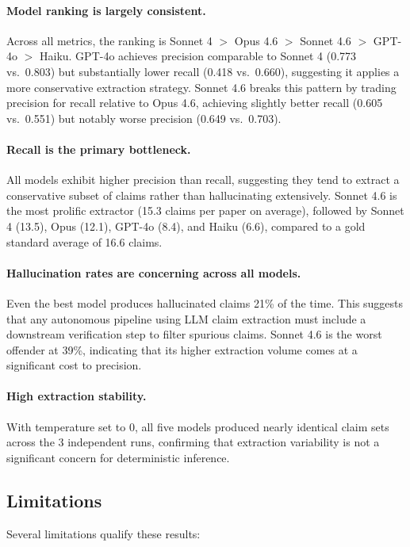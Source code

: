 \documentclass[11pt,a4paper]{article}
\begin{document}
\paragraph{Model ranking is largely consistent.}
Across all metrics, the ranking is Sonnet 4 $>$ Opus 4.6 $>$ Sonnet 4.6
$>$ GPT-4o $>$ Haiku.  GPT-4o achieves precision comparable to Sonnet 4
(0.773 vs.\ 0.803) but substantially lower recall (0.418 vs.\ 0.660),
suggesting it applies a more conservative extraction strategy.  Sonnet 4.6
breaks this pattern by trading precision for recall relative to Opus 4.6,
achieving slightly better recall (0.605 vs.\ 0.551) but notably worse
precision (0.649 vs.\ 0.703).

\paragraph{Recall is the primary bottleneck.}
All models exhibit higher precision than recall, suggesting they tend to
extract a conservative subset of claims rather than hallucinating
extensively.  Sonnet 4.6 is the most prolific extractor (15.3 claims per
paper on average), followed by Sonnet 4 (13.5), Opus (12.1), GPT-4o
(8.4), and Haiku (6.6), compared to a gold standard average of 16.6
claims.

\paragraph{Hallucination rates are concerning across all models.}
Even the best model produces hallucinated claims 21\% of the time.  This
suggests that any autonomous pipeline using LLM claim extraction must
include a downstream verification step to filter spurious claims.  Sonnet
4.6 is the worst offender at 39\%, indicating that its higher extraction
volume comes at a significant cost to precision.

\paragraph{High extraction stability.}
With temperature set to 0, all five models produced nearly identical
claim sets across the 3 independent runs, confirming that extraction
variability is not a significant concern for deterministic inference.

\subsection{Limitations}

Several limitations qualify these results:
\end{document}
